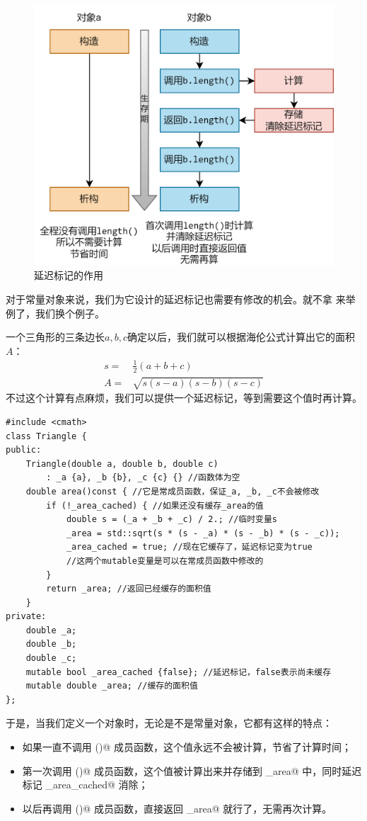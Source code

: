 \begin{figure}[htbp]
    \centering
    \includegraphics[width=.8\textwidth]{../images/generalized_parts/08_lazy_tag.png}
    \caption{延迟标记的作用}
\end{figure}
对于常量对象来说，我们为它设计的延迟标记也需要有修改的机会。就不拿 \lstinline@valarri@ 来举例了，我们换个例子。\par
一个三角形的三条边长$a, b, c$确定以后，我们就可以根据海伦公式计算出它的面积$A$：
\begin{align*}
s=&{}\frac12(a+b+c)\\
A=&{}\sqrt{s(s-a)(s-b)(s-c)}
\end{align*}
不过这个计算有点麻烦，我们可以提供一个延迟标记，等到需要这个值时再计算。
\begin{lstlisting}
#include <cmath>
class Triangle {
public:
    Triangle(double a, double b, double c)
        : _a {a}, _b {b}, _c {c} {} //函数体为空
    double area()const { //它是常成员函数，保证_a, _b, _c不会被修改
        if (!_area_cached) { //如果还没有缓存_area的值
            double s = (_a + _b + _c) / 2.; //临时变量s
            _area = std::sqrt(s * (s - _a) * (s - _b) * (s - _c));
            _area_cached = true; //现在它缓存了，延迟标记变为true
            //这两个mutable变量是可以在常成员函数中修改的
        }
        return _area; //返回已经缓存的面积值
    }
private:
    double _a;
    double _b;
    double _c;
    mutable bool _area_cached {false}; //延迟标记，false表示尚未缓存
    mutable double _area; //缓存的面积值
};
\end{lstlisting}\par
于是，当我们定义一个对象时，无论是不是常量对象，它都有这样的特点：
\begin{itemize}
    \item 如果一直不调用 \lstinline@area()@ 成员函数，这个值永远不会被计算，节省了计算时间；
    \item 第一次调用 \lstinline@area()@ 成员函数，这个值被计算出来并存储到 \lstinline@_area@ 中，同时延迟标记 \lstinline@_area_cached@ 消除；
    \item 以后再调用 \lstinline@area()@ 成员函数，直接返回 \lstinline@_area@ 就行了，无需再次计算。
\end{itemize}\par
